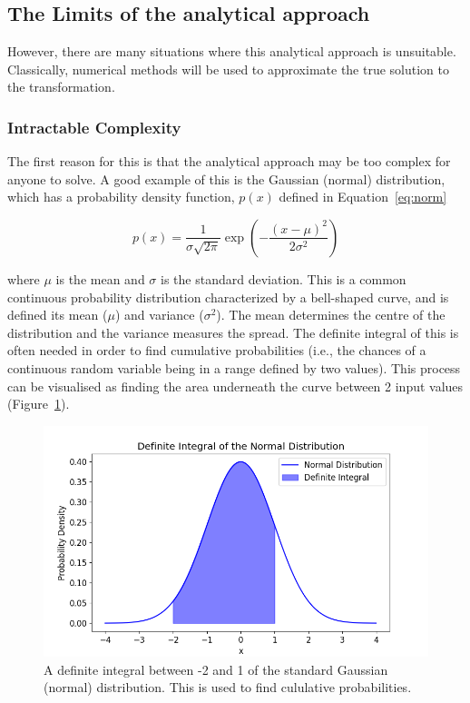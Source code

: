 \documentclass[12pt]{article}
\begin{document}
    \subsection{The Limits of the analytical approach}

    However, there are many situations where this analytical approach is unsuitable.
    Classically, numerical methods will be used to approximate the true solution to the transformation.

    \subsubsection{Intractable Complexity}\label{subsubsec:int-comp}

    The first reason for this is that the analytical approach may be too complex for anyone to solve.
    A good example of this is the Gaussian (normal) distribution, which has a probability density function, $p(x)$ defined in Equation~\ref{eq:norm}

    \begin{equation}
        p(x) = \frac{1}{\sigma\sqrt{2\pi}} \exp\left(-\frac{(x - \mu)^2}{2\sigma^2}\right)\label{eq:norm}
    \end{equation}


    where $\mu$ is the mean and $\sigma$ is the standard deviation.
    This is a common continuous probability distribution characterized by a bell-shaped curve, and is defined its mean ($\mu$) and variance ($\sigma^2$). The mean determines the centre of the distribution and the variance measures the spread.
    The definite integral of this is often needed in order to find cumulative probabilities (i.e., the chances of a continuous random variable being in a range defined by two values).
    This process can be visualised as finding the area underneath the curve between 2 input values (Figure~\ref{fig:ndi_}).

    \begin{figure}[htbp]
        \centering
        \includegraphics[width=0.8\linewidth]{figures/ndi/ndi_}
        \caption{A definite integral between -2 and 1 of the standard Gaussian (normal) distribution. This is used to find cululative probabilities.}
        \label{fig:ndi_}
    \end{figure}
\end{document}

